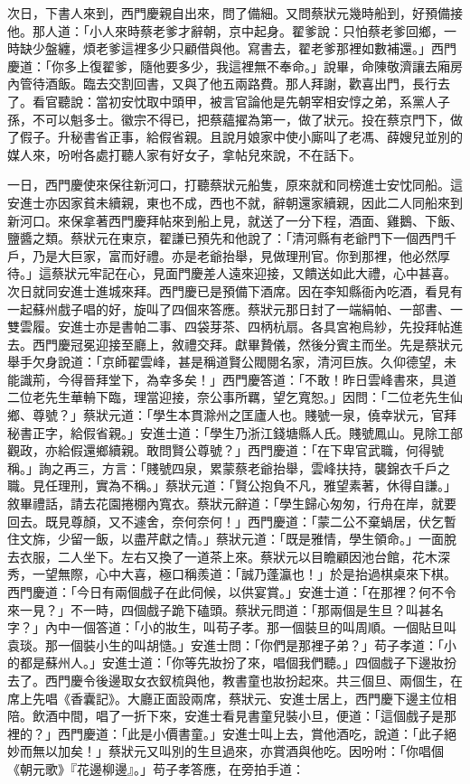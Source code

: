 \begin{showcontents}{}
次日，下書人來到，西門慶親自出來，問了備細。又問蔡狀元幾時船到，好預備接他。那人道：「小人來時蔡老爹才辭朝，京中起身。翟爹說：只怕蔡老爹回鄉，一時缺少盤纏，煩老爹這裡多少只顧借與他。寫書去，翟老爹那裡如數補還。」西門慶道：「你多上復翟爹，隨他要多少，我這裡無不奉命。」說畢，命陳敬濟讓去廂房內管待酒飯。臨去交割回書，又與了他五兩路費。那人拜謝，歡喜出門，長行去了。看官聽說：當初安忱取中頭甲，被言官論他是先朝宰相安惇之弟，系黨人子孫，不可以魁多士。徽宗不得已，把蔡蘊擢為第一，做了狀元。投在蔡京門下，做了假子。升秘書省正事，給假省親。且說月娘家中使小廝叫了老馮、薛嫂兒並別的媒人來，吩咐各處打聽人家有好女子，拿帖兒來說，不在話下。

一日，西門慶使來保往新河口，打聽蔡狀元船隻，原來就和同榜進士安忱同船。這安進士亦因家貧未續親，東也不成，西也不就，辭朝還家續親，因此二人同船來到新河口。來保拿著西門慶拜帖來到船上見，就送了一分下程，酒面、雞鵝、下飯、鹽醬之類。蔡狀元在東京，翟謙已預先和他說了：「清河縣有老爺門下一個西門千戶，乃是大巨家，富而好禮。亦是老爺抬舉，見做理刑官。你到那裡，他必然厚待。」這蔡狀元牢記在心，見面門慶差人遠來迎接，又饋送如此大禮，心中甚喜。次日就同安進士進城來拜。西門慶已是預備下酒席。因在李知縣衙內吃酒，看見有一起蘇州戲子唱的好，旋叫了四個來答應。蔡狀元那日封了一端絹帕、一部書、一雙雲履。安進士亦是書帕二事、四袋芽茶、四柄杭扇。各具宮袍烏紗，先投拜帖進去。西門慶冠冕迎接至廳上，敘禮交拜。獻畢贄儀，然後分賓主而坐。先是蔡狀元舉手欠身說道：「京師翟雲峰，甚是稱道賢公閥閱名家，清河巨族。久仰德望，未能識荊，今得晉拜堂下，為幸多矣！」西門慶答道：「不敢！昨日雲峰書來，具道二位老先生華輈下臨，理當迎接，奈公事所羈，望乞寬恕。」因問：「二位老先生仙鄉、尊號？」蔡狀元道：「學生本貫滁州之匡廬人也。賤號一泉，僥幸狀元，官拜秘書正字，給假省親。」安進士道：「學生乃浙江錢塘縣人氏。賤號鳳山。見除工部觀政，亦給假還鄉續親。敢問賢公尊號？」西門慶道：「在下卑官武職，何得號稱。」詢之再三，方言：「賤號四泉，累蒙蔡老爺抬舉，雲峰扶持，襲錦衣千戶之職。見任理刑，實為不稱。」蔡狀元道：「賢公抱負不凡，雅望素著，休得自謙。」敘畢禮話，請去花園捲棚內寬衣。蔡狀元辭道：「學生歸心匆匆，行舟在岸，就要回去。既見尊顏，又不遽舍，奈何奈何！」西門慶道：「蒙二公不棄蝸居，伏乞暫住文旆，少留一飯，以盡芹獻之情。」蔡狀元道：「既是雅情，學生領命。」一面脫去衣服，二人坐下。左右又換了一道茶上來。蔡狀元以目瞻顧因池台館，花木深秀，一望無際，心中大喜，極口稱羨道：「誠乃蓬瀛也！」於是抬過棋桌來下棋。西門慶道：「今日有兩個戲子在此伺候，以供宴賞。」安進士道：「在那裡？何不令來一見？」不一時，四個戲子跪下磕頭。蔡狀元問道：「那兩個是生旦？叫甚名字？」內中一個答道：「小的妝生，叫苟子孝。那一個裝旦的叫周順。一個貼旦叫袁琰。那一個裝小生的叫胡慥。」安進士問：「你們是那裡子弟？」苟子孝道：「小的都是蘇州人。」安進士道：「你等先妝扮了來，唱個我們聽。」四個戲子下邊妝扮去了。西門慶令後邊取女衣釵梳與他，教書童也妝扮起來。共三個旦、兩個生，在席上先唱《香囊記》。大廳正面設兩席，蔡狀元、安進士居上，西門慶下邊主位相陪。飲酒中間，唱了一折下來，安進士看見書童兒裝小旦，便道：「這個戲子是那裡的？」西門慶道：「此是小價書童。」安進士叫上去，賞他酒吃，說道：「此子絕妙而無以加矣！」蔡狀元又叫別的生旦過來，亦賞酒與他吃。因吩咐：「你唱個《朝元歌》『花邊柳邊』。」苟子孝答應，在旁拍手道：


\end{showcontents}

